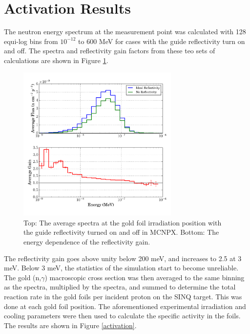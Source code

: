 \documentclass[a4paper,
              ]{jacow}
\begin{document}
\section{Activation Results}

The neutron energy spectrum at the measurement point was calculated with 128 equi-log bins from $10^{-12}$ to 600 MeV for cases with the guide reflectivity turn on and off.  The spectra and reflectivity gain factors from these teo sets of calculations are shown in Figure \ref{gain}.  

\begin{figure}[!htb]
   \centering
   \includegraphics*[trim = 0mm 5mm 0mm 5mm, width=80mm]{graphics/gain.pdf}
   \caption{Top: The average spectra at the gold foil irradiation position with the guide reflectivity turned on and off in MCNPX.  Bottom: The energy dependence of the reflectivity gain.}
   \label{gain}
\end{figure}

The reflectivity gain goes above unity below 200 meV, and increases to 2.5 at 3 meV.  Below 3 meV, the statistics of the simulation start to become unreliable.  The gold (n,$\gamma$) macroscopic cross section was then averaged to the same binning as the spectra, multiplied by the spectra, and summed to determine the total reaction rate in the gold foils per incident proton on the SINQ target.  This was done at each gold foil position.  The aforementioned experimental irradiation and cooling parameters were then used to calculate the specific activity in the foils.  The results are shown in Figure \ref{activation}.
\end{document}
